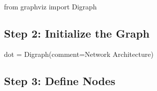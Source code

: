 \documentclass[
  letterpaper,
  DIV=11,
  numbers=noendperiod]{scrreprt}
\newenvironment{Shaded}{\begin{snugshade}}{\end{snugshade}}
\newcommand{\ImportTok}[1]{\textcolor[rgb]{0.00,0.46,0.62}{#1}}
\newcommand{\NormalTok}[1]{\textcolor[rgb]{0.00,0.23,0.31}{#1}}
\newcommand{\OperatorTok}[1]{\textcolor[rgb]{0.37,0.37,0.37}{#1}}
\newcommand{\StringTok}[1]{\textcolor[rgb]{0.13,0.47,0.30}{#1}}
\begin{document}
\begin{Shaded}
\begin{Highlighting}[]
\ImportTok{from}\NormalTok{ graphviz }\ImportTok{import}\NormalTok{ Digraph}
\end{Highlighting}
\end{Shaded}

\subsection{Step 2: Initialize the
Graph}\label{step-2-initialize-the-graph}

\begin{Shaded}
\begin{Highlighting}[]
\NormalTok{dot }\OperatorTok{=}\NormalTok{ Digraph(comment}\OperatorTok{=}\StringTok{\textquotesingle{}Network Architecture\textquotesingle{}}\NormalTok{)}
\end{Highlighting}
\end{Shaded}

\subsection{Step 3: Define Nodes}\label{step-3-define-nodes}
\end{document}
